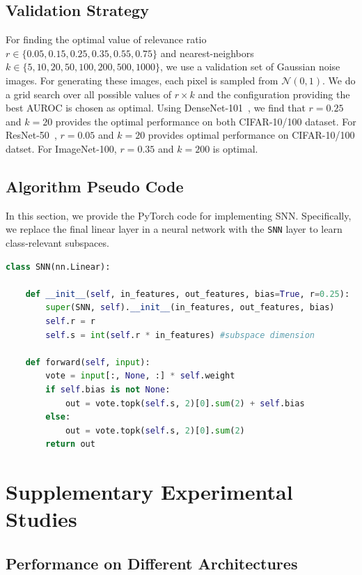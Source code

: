 \documentclass[letterpaper]{article} %
\theoremstyle{plain}
\theoremstyle{definition}
\theoremstyle{remark}
\begin{document}
\subsection{Validation Strategy}
\label{app:validation}
For finding the optimal value of relevance ratio $r\in\{0.05,0.15,0.25,0.35,0.55,0.75\}$ and nearest-neighbors $k\in\{5,10,20,50,100,200,500,1000\}$, we use a validation set of Gaussian noise images. For generating these images, each pixel is sampled from $\mathcal{N} (0, 1)$. We do a grid search over all possible values of $r \times k$ and the configuration providing the best AUROC is chosen as optimal. Using DenseNet-101~\cite{huang2018densely}, we find that $r = 0.25$ and $k=20$ provides the optimal performance on both CIFAR-10/100 dataset. For ResNet-50~\cite{he2016deep}, $r=0.05$ and $k=20$ provides optimal performance on CIFAR-10/100 datset. For ImageNet-100, $r = 0.35$ and $k=200$ is optimal.



\subsection{Algorithm Pseudo Code}
\label{app:pseudo}
In this section, we provide the PyTorch code for implementing SNN. Specifically, we replace the final linear layer in a neural network with the \verb|SNN| layer to learn class-relevant subspaces.


{\small 
\begin{lstlisting}[language=Python]
class SNN(nn.Linear):

    def __init__(self, in_features, out_features, bias=True, r=0.25):
        super(SNN, self).__init__(in_features, out_features, bias)
        self.r = r
        self.s = int(self.r * in_features) #subspace dimension
        
    def forward(self, input):
        vote = input[:, None, :] * self.weight
        if self.bias is not None:
            out = vote.topk(self.s, 2)[0].sum(2) + self.bias
        else:
            out = vote.topk(self.s, 2)[0].sum(2)
        return out

\end{lstlisting}}
\section{Supplementary Experimental Studies}
\subsection{Performance on Different Architectures}
\label{app:diff_arch}
\end{document}
